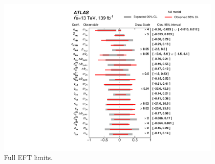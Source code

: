 \begin{figure}
    \centering
    \includegraphics[width=\mediumfigwidth]{Figures/m4l/Interpretations/EFTLimits_MVozak.pdf}
    \caption{Full EFT limits.}
    \label{fig:EFTfull}
\end{figure}




